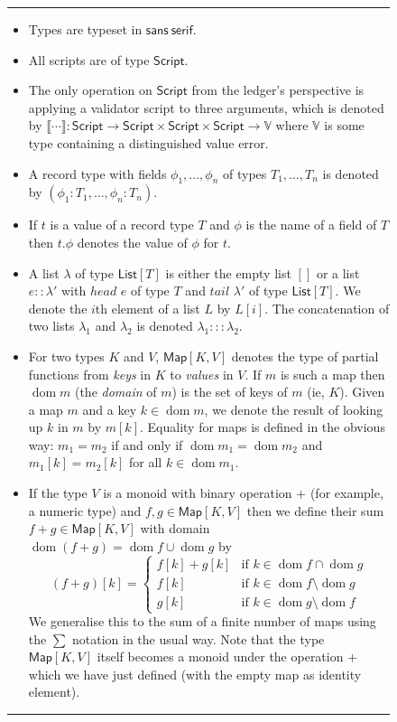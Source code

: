\documentclass[a4paper]{article}
\newcommand{\s}{\textsf}  %
\theoremstyle{definition}  %
\newcommand\rfskip{7pt}
\newenvironment{ruledfigure}[1]{\begin{figure}[#1]\hrule\vspace{\rfskip}}{\vspace{\rfskip}\hrule\end{figure}}
\newcommand{\List}[1]{\ensuremath{\s{List}[#1]}}
\newcommand{\Map}[2]{\ensuremath{\s{Map}[#1,#2]}}
\newcommand{\dom}{\ensuremath{\mathop{\mathrm{dom}}}}
\begin{document}
\begin{ruledfigure}{H}
\begin{itemize}
\item Types are typeset in $\mathsf{sans~serif}$.

\item All scripts are of type $\mathsf{Script}$.

\item The only operation on $\mathsf{Script}$ from the ledger's
  perspective is applying a validator script to three arguments,
  which is denoted by $\llbracket \cdots \rrbracket :
  \mathsf{Script} \rightarrow \mathsf{Script} \times \mathsf{Script}
    \times \mathsf{Script} \rightarrow \mathbb{V}$ where $\mathbb{V}$
    is some type containing a distinguished value
    \textsf{error}\footnotemark.

\item A record type with fields $\phi_1, \ldots, \phi_n$ of types $T_1,
  \ldots, T_n$ is denoted by $(\phi_1 : T_1, \ldots, \phi_n : T_n)$.

\item If $t$ is a value of a record type $T$ and $\phi$ is the name
  of a field of $T$ then $t.\phi$ denotes the value of $\phi$ for
  $t$.
  
\item A list $\lambda$ of type $\List{T}$ is
    either the empty list $[]$ or a list $e :: \lambda'$ with $head$
    $e$ of type $T$ and $tail$ $\lambda'$ of type
    $\List{T}$. We denote the $i$th element of a list
    $L$ by $L[i]$.
    The concatenation of two lists $\lambda_1$ and
    $\lambda_2$ is denoted $\lambda_1 ::: \lambda_2$.

  \item For two types $K$ and $V$, $\Map{K}{V}$ denotes the type of
    partial functions from \textit{keys} in $K$ to \textit{values} in
    $V$.  If $m$ is such a map then $\dom m$ (the \textit{domain} of
    $m$) is the set of keys of $m$ (ie, $K$).  Given a map $m$ and a
    key $k \in \dom m$, we denote the result of looking up $k$ in $m$
    by $m[k]$.  Equality for maps is defined in the obvious way: $m_1
    = m_2$ if and only if $\dom m_1 = \dom m_2$ and $m_1[k] = m_2[k]$
    for all $k \in \dom m_1$.
    
  \item If the type $V$ is a monoid with binary operation $+$ (for
    example, a numeric type) and $f, g \in \Map{K}{V}$ then we define
    their sum $f+g \in \Map{K}{V}$ with domain $\dom (f+g) = \dom f
    \cup \dom g$ by
    \[
    (f+g)[k] =
    \left\{ \begin{array}{ll}
        f[k] + g[k] & \mbox{if $k \in \dom f \cap \dom g$}\\
        f[k] & \mbox{if $k \in \dom f \setminus \dom g$}\\
        g[k] & \mbox{if $k \in \dom g \setminus \dom f$}
      \end{array}
      \right.
      \]
      We generalise this to the sum of a finite number of maps using
      the $\sum$ notation in the usual way.  Note that the type
      $\Map{K}{V}$ itself becomes a monoid under the operation $+$
      which we have just defined (with the empty map as identity element).


\end{itemize}
\end{ruledfigure}
\end{document}

